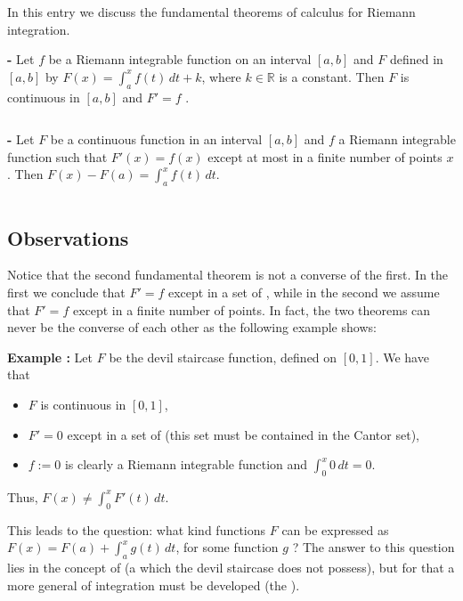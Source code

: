 \documentclass[12pt]{article}
\begin{document}
In this entry we discuss the fundamental theorems of calculus for Riemann integration.

{\bf {} -} Let $f$ be a Riemann integrable function on an interval $[a,b]$ and $F$ defined in $[a,b]$ by $F(x)= \int_a^x f(t)\,dt + k$, where $k \in \mathbb{R}$ is a constant. Then $F$ is continuous in $[a,b]$ and $F'=f$ .

$\,$

{\bf {} -} Let $F$ be a continuous function in an interval $[a,b]$ and $f$ a Riemann integrable function such that $F'(x)=f(x)$ except at most in a finite number of points $x$. Then $F(x)-F(a) = \int_a^xf(t)\,dt$.

$\,$

\subsection{Observations}
Notice that the second fundamental theorem is not a converse of the first. In the first we conclude that $F'=f$ except in a set of , while in the second we assume that $F'=f$ except in a finite number of points. In fact, the two theorems can never be the converse of each other as the following example shows:

{\bf Example :} Let $F$ be the devil staircase function, defined on $[0,1]$. We have that
\begin{itemize}
\item $F$ is continuous in $[0,1]$,
\item $F'=0$ except in a set of  (this set must be contained in the Cantor set),
\item $f:=0$ is clearly a Riemann integrable function and $\int_0^x 0\,dt = 0$.
\end{itemize}
Thus, $F(x) \neq \int_0^x F'(t)\,dt$.

This leads to the question: what kind functions $F$ can be expressed as $F(x) = F(a) + \int_a^x g(t)\,dt$, for some function $g$ ? The answer to this question lies in the concept of  (a  which the devil staircase does not possess), but for that a more general  of integration must be developed (the ).
\end{document}

